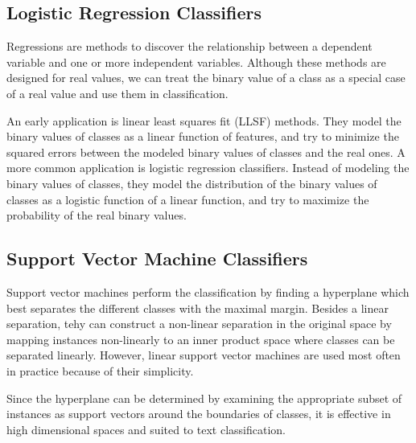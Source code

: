 \subsection{Logistic Regression Classifiers}
\par Regressions are methods to discover the relationship between a dependent variable and one or more independent variables. Although these methods are designed for real values, we can treat the binary value of a class as a special case of a real value and use them in classification\cite{aggarwal2012tc}.
\par An early application is linear least squares fit (LLSF) methods. They model the binary values of classes as a linear function of features, and try to minimize the squared errors between the modeled binary values of classes and the real ones\cite{yang1994knn,yang1999mlall}. A more common application is logistic regression classifiers. Instead of modeling the binary values of classes, they model the distribution of the binary values of classes as a logistic function of a linear function, and try to maximize the probability of the real binary values\cite{ng2002nblr,zhang2003lrsvm}.

\subsection{Support Vector Machine Classifiers}
\par Support vector machines perform the classification by finding a hyperplane which best separates the different classes with the maximal margin\cite{cortes1995svm}. Besides a linear separation, tehy can construct a non-linear separation in the original space by mapping instances non-linearly to an inner product space where classes can be separated linearly. However, linear support vector machines are used most often in practice because of their simplicity\cite{aggarwal2012tc}.
\par Since the hyperplane can be determined by examining the appropriate subset of instances as support vectors around the boundaries of classes, it is effective in high dimensional spaces and suited to text classification\cite{yang1999mlall,zhang2003lrsvm,joachims1998svm,joachims1999svm,joachims2001svm}.

